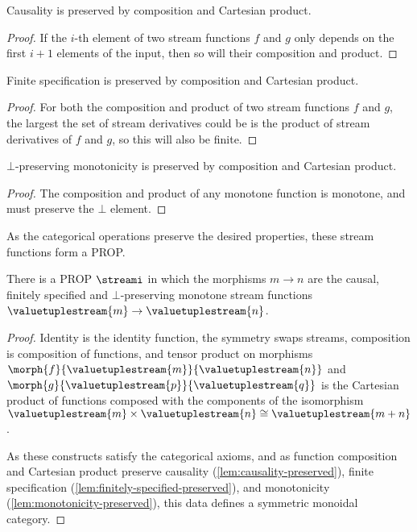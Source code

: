 \documentclass{lmcs}
\begin{document}
\begin{lem}\label{lem:causality-preserved}
    Causality is preserved by composition and Cartesian product.
\end{lem}
\begin{proof}
    If the \(i\)-th element of two stream functions \(f\) and \(g\) only depends
    on the first \(i+1\) elements of the input, then so will their composition
    and product.
\end{proof}

\begin{lem}\label{lem:finitely-specified-preserved}
    Finite specification is preserved by composition and Cartesian
    product.
\end{lem}
\begin{proof}
    For both the composition and product of two stream functions \(f\) and
    \(g\), the largest the set of stream derivatives could be is the product of
    stream derivatives of \(f\) and \(g\), so this will also be finite.
\end{proof}

\begin{lem}\label{lem:monotonicity-preserved}
    \(\bot\)-preserving monotonicity is preserved by composition and Cartesian
    product.
\end{lem}
\begin{proof}
    The composition and product of any monotone function is monotone, and must
    preserve the \(\bot\) element.
\end{proof}

As the categorical operations preserve the desired properties, these stream
functions form a PROP.

\begin{prop}
    There is a PROP \(\streami\) in which the morphisms \(m \to n\) are the
    causal, finitely specified and \(\bot\)-preserving monotone stream
    functions \(\valuetuplestream{m} \to \valuetuplestream{n}\).
\end{prop}
\begin{proof}
    Identity is the identity function, the symmetry swaps streams, composition
    is composition of functions, and tensor product on morphisms
    \(\morph{f}{\valuetuplestream{m}}{\valuetuplestream{n}}\) and
    \(\morph{g}{\valuetuplestream{p}}{\valuetuplestream{q}}\) is the Cartesian
    product of functions composed with the components of the isomorphism
    \(\valuetuplestream{m} \times \valuetuplestream{n}
    \cong \valuetuplestream{m+n}\).

    As these constructs satisfy the categorical axioms, and as function
    composition and Cartesian product preserve causality
    (\cref{lem:causality-preserved}),
    finite specification (\cref{lem:finitely-specified-preserved}),
    and monotonicity (\cref{lem:monotonicity-preserved}), this data defines a
    symmetric monoidal category.
\end{proof}
\end{document}
